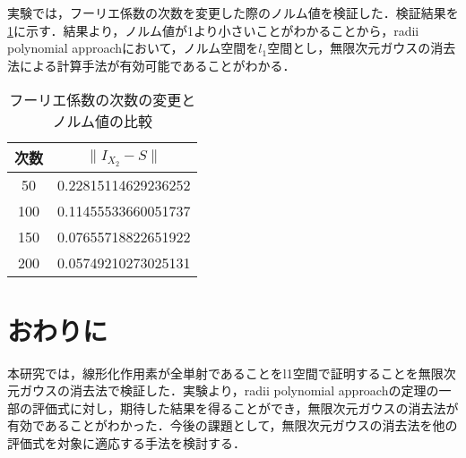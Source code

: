 \documentclass[a4paper,10pt,twocolumn]{jsarticle}
\newcommand{\rad}{radii polynomial approach}
\begin{document}
実験では，フーリエ係数の次数を変更した際のノルム値を検証した．検証結果を\cref{tab:norm-num}に示す．結果より，ノルム値が1より小さいことがわかることから，\rad{}において，ノルム空間を$l_1$空間とし，無限次元ガウスの消去法による計算手法が有効可能であることがわかる．
\begin{table}[htbp]
  \centering
  \caption{フーリエ係数の次数の変更とノルム値の比較}
  \label{tab:norm-num}
  \begin{tabular}{c||c}
    次数 & $\| I_{X_2}-S \|$ \\ \hline
    50 & 0.22815114629236252 \\
    100&0.11455533660051737\\
    150&0.07655718822651922\\
    200&0.05749210273025131
\end{tabular}
\end{table}

\vspace{-1mm}
\section{おわりに}
\vspace{-1mm}
本研究では，線形化作用素が全単射であることをl1空間で証明することを無限次元ガウスの消去法で検証した．実験より，\rad{}の定理の一部の評価式に対し，期待した結果を得ることができ，無限次元ガウスの消去法が有効であることがわかった．今後の課題として，無限次元ガウスの消去法を他の評価式を対象に適応する手法を検討する．

\vspace{-1mm}

{\footnotesize

}
\end{document}
